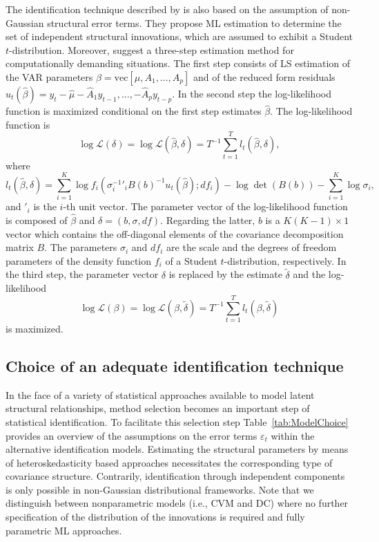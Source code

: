 \documentclass[nojss]{jss}\usepackage[]{graphicx}\usepackage[]{color}
\begin{document}
The identification technique described by \cite{LMS2017} is also based on the assumption of non-Gaussian structural error terms. They propose ML estimation to determine the set of independent structural innovations, which are assumed to exhibit a Student $t$-distribution. Moreover, \cite{LMS2017} suggest a three-step estimation method for computationally demanding situations. The first step consists of LS estimation of the VAR parameters $\beta = \mbox{vec}[\mu, A_1, ..., A_p]$ and of the reduced form residuals {$u_{t}(\widehat{\beta}) = y_t - \widehat{\mu} - \widehat{A}_{1}y_{t-1},...,-\widehat{A}_{p}y_{t-p}$}. In the second step the log-likelihood function is maximized conditional on the  first step estimates $\widehat{\beta}$. The log-likelihood function is
\begin{equation}\label{lik_ngml}
\log \mathcal{L}(\delta) = \log \mathcal{L}(\widehat{\beta}, \delta) = T^{-1}\sum^T_{t =1} l_t(\widehat{\beta}, \delta),
\end{equation}
where
$$
l_t(\widehat{\beta}, \delta) = \sum^K_{i = 1}\log f_i(\sigma^{-1}_i\prime_iB(b)^{-1}u_t(\widehat{\beta}); df_i) - \log \det(B(b)) - \sum^K_{i = 1}\log\sigma_i,$$
and $\prime_i$ is the $i$-th unit vector. The parameter vector of the log-likelihood function is composed of $\widehat{\beta}$ and  $ \delta = (b, \sigma, df)$. Regarding the latter, $b$ is a $K(K-1) \times 1$ vector which contains the off-diagonal elements of the covariance decomposition matrix $B$. The parameters $\sigma_i$ and $df_i$ are the scale and the degrees of freedom parameters of the density function $f_i$ of a Student $t$-distribution, respectively. In the third step, the parameter vector $\delta$ is replaced by the estimate $\tilde{\delta}$ and the log-likelihood
$$
\log \mathcal{L}(\beta) = \log \mathcal{L}(\beta, \widetilde{\delta}) = T^{-1}\sum^T_{t =1} l_t(\beta, \widetilde{\delta})
$$
is maximized.

\subsection{Choice of an adequate identification technique}

In the face of a variety of statistical approaches available to model latent structural relationships, method selection becomes an important step of statistical identification. To facilitate this selection step Table~\ref{tab:ModelChoice} provides an overview of the assumptions on the error terms $\varepsilon_t$ within the alternative identification models. Estimating the structural parameters by means of heteroskedasticity based approaches necessitates the corresponding type of covariance structure. Contrarily, identification through independent components is only possible in  non-Gaussian distributional frameworks. Note that we distinguish between nonparametric models (i.e., CVM and DC) where no further specification of the distribution of the innovations is required and fully parametric ML approaches.
\end{document}
